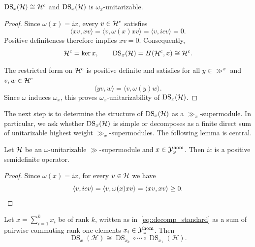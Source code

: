 \begin{proposition}\label{prop::form_DS_x_generalized} $\operatorname{DS}_{x}({\mathcal{H}})\cong {\mathcal{H}}^{c}$ and $\operatorname{DS}_{x}({\mathcal{H}})$ is $\omega_{x}$-unitarizable.
\end{proposition}

\begin{proof} Since $\omega(x)=ix$, every
    $v\in{\mathcal{H}}^c$ satisfies
    \[
        \langle xv,xv\rangle
        =\langle v,\omega(x)xv\rangle
        =\langle v,icv\rangle
        =0.
    \]
    Positive definiteness therefore implies $xv=0$.
    Consequently,
    \[
        {\mathcal{H}}^c=\ker x,
        \qquad
        \operatorname{DS}_x({\mathcal{H}})=H({\mathcal{H}}^c,x)\cong{\mathcal{H}}^c.
    \]

    The restricted form on ${\mathcal{H}}^c$ is positive definite and satisfies for all $y \in \gg^{x}$ and $v,w \in {\mathcal{H}}^{c}$
    \[
        \langle yv,w\rangle=\langle v,\omega(y)w\rangle.
    \]
    Since $\omega$ induces $\omega_x$, this proves
    $\omega_x$-unitarizability of $\operatorname{DS}_x({\mathcal{H}})$.
\end{proof}

The next step is to determine the structure of $\operatorname{DS}_x({\mathcal{H}})$ as a $\gg_x$-supermodule. In particular, we ask whether $\operatorname{DS}_x({\mathcal{H}})$ is simple or decomposes as a finite direct sum of unitarizable highest weight $\gg_x$-supermodules. The following lemma is central.

\begin{lemma}\label{lemm::ic_positive_semidefinite}
    Let ${\mathcal{H}}$ be an $\omega$-unitarizable $\gg$-supermodule
    and $x\in{\mathcal Y}_\omega^{\hom}$. Then $ic$ is a positive semidefinite operator.
\end{lemma}

\begin{proof}
    Since $\omega(x)=ix$, for every $v\in{\mathcal{H}}$ we have
    \[
        \langle v,icv\rangle
        =\langle v,\omega(x)xv\rangle
        =\langle xv,xv\rangle\geq0.\qedhere
    \]
\end{proof}

\begin{proposition}\label{prop::DS_composition}
   Let $x=\sum_{i=1}^{k}x_{i}$ be of rank $k$, written as in~\eqref{eq::decomp_standard} as a sum of pairwise commuting rank-one elements $x_i\in{\mathcal Y}^{\hom}_\omega$. Then
   \[
\operatorname{DS}_x(\mathcal H)
\cong
\operatorname{DS}_{x_k}\circ\cdots\circ
\operatorname{DS}_{x_1}(\mathcal H).
\]
\end{proposition}

